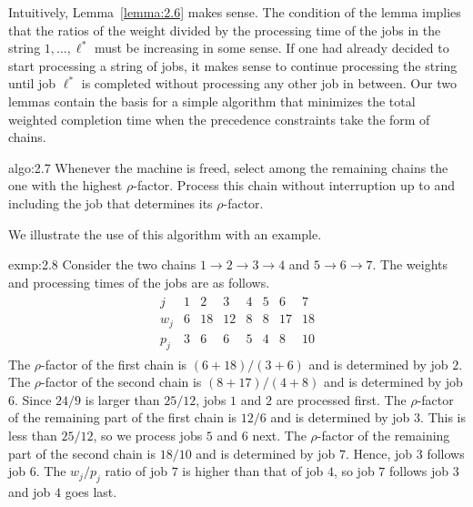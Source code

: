 Intuitively, Lemma~\ref{lemma:2.6} makes sense. The condition of the lemma 
implies that the ratios of the weight divided by the processing time of the 
jobs in the string $1, \dots, \ell^*$ must be increasing in some sense. 
If one had already decided to start processing a string of jobs, it makes 
sense to continue processing the string until job $\ell^*$ is completed 
without processing any other job in between. Our two lemmas contain the 
basis for a simple algorithm that minimizes the total weighted completion 
time when the precedence constraints take the form of chains.

\begin{algo}{algo:2.7}
    Whenever the machine is freed, select among the remaining chains the one 
    with the highest $\rho$-factor. Process this chain without interruption 
    up to and including the job that determines its $\rho$-factor.
\end{algo}

We illustrate the use of this algorithm with an example. 

\begin{exmp}{exmp:2.8}
    Consider the two chains $1 \to 2 \to 3 \to 4$ and $5 \to 6 \to 7$. 
    The weights and processing times of the jobs are as follows. 
    \begin{align*}
        \begin{array}{c|ccccccc}
        j   & 1 & 2  & 3  & 4 & 5 & 6  & 7  \\ \hline
        w_j & 6 & 18 & 12 & 8 & 8 & 17 & 18 \\
        p_j & 3 & 6  & 6  & 5 & 4 & 8  & 10
        \end{array}
    \end{align*}
    The $\rho$-factor of the first chain is $(6+18)/(3+6)$ and is determined 
    by job $2$. The $\rho$-factor of the second chain is $(8+17)/(4+8)$ and 
    is determined by job $6$. Since $24/9$ is larger than $25/12$, jobs 
    $1$ and $2$ are processed first. The $\rho$-factor of the remaining 
    part of the first chain is $12/6$ and is determined by job $3$. This is 
    less than $25/12$, so we process jobs $5$ and $6$ next. The $\rho$-factor 
    of the remaining part of the second chain is $18/10$ and is determined by 
    job $7$. Hence, job $3$ follows job $6$. The $w_j/p_j$ ratio of job $7$ 
    is higher than that of job $4$, so job $7$ follows job $3$ and job $4$ 
    goes last. 
\end{exmp}

